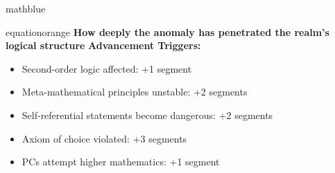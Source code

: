 \documentclass[11pt]{article}
\begin{document}
\begin{campaignsection}{mathblue}
\begin{clockbox}{equationorange}
\textbf{How deeply the anomaly has penetrated the realm's logical structure}
\textbf{Advancement Triggers:}
\begin{itemize}
    \item Second-order logic affected: +1 segment
    \item Meta-mathematical principles unstable: +2 segments
    \item Self-referential statements become dangerous: +2 segments
    \item Axiom of choice violated: +3 segments
    \item PCs attempt higher mathematics: +1 segment
\end{itemize}
\end{clockbox}
\end{campaignsection}

\newpage
\end{document}
